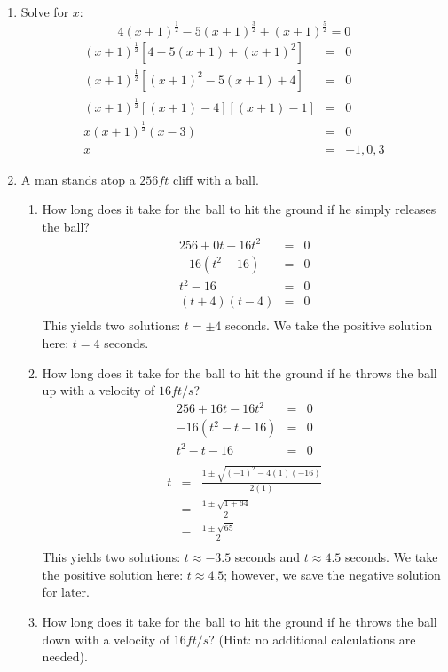 \documentclass[letterpaper,12pt,fleqn]{article}
\begin{document}
\begin{enumerate}
\item Solve for $x$:
  \[4(x+1)^{\frac{1}{2}}-5(x+1)^{\frac{3}{2}}+(x+1)^{\frac{5}{2}}=0\]
  \begin{eqnarray*}
    (x+1)^{\frac{1}{2}}[4-5(x+1)+(x+1)^2] &=& 0 \\
    (x+1)^{\frac{1}{2}}[(x+1)^2-5(x+1)+4] &=& 0 \\
    (x+1)^{\frac{1}{2}}[(x+1)-4][(x+1)-1] &=& 0 \\
    x(x+1)^{\frac{1}{2}}(x-3) &=& 0 \\
    x &=& -1,0,3
  \end{eqnarray*}

\item A man stands atop a $256ft$ cliff with a  ball.
\begin{enumerate}
\item How long does it take for the ball to hit the ground if he simply
releases the ball?
\begin{eqnarray*}
256+0t-16t^2 &=& 0 \\
-16(t^2-16) &=& 0 \\
t^2-16 &=& 0 \\
(t+4)(t-4) &=& 0 \\
\end{eqnarray*}
This yields two solutions: $t=\pm4$ seconds. We take the positive solution
here: $t=4$ seconds.

\item How long does it take for the ball to hit the ground if he throws the
ball up with a velocity of $16 ft/s$?
\begin{eqnarray*}
256+16t-16t^2 &=& 0 \\
-16(t^2-t-16) &=& 0 \\
t^2-t-16 &=& 0 \\
\end{eqnarray*}
\begin{eqnarray*}
t &=& \frac{1\pm\sqrt{(-1)^2-4(1)(-16)}}{2(1)} \\
    &=& \frac{1\pm\sqrt{1+64}}{2} \\
    &=& \frac{1\pm\sqrt{65}}{2} \\
\end{eqnarray*}
This yields two solutions: $t\approx-3.5$ seconds and $t\approx4.5$ seconds.
We take the positive solution here: $t\approx4.5$; however, we save the
negative solution for later.

\item How long does it take for the ball to hit the ground if he throws the
ball down with a velocity of $16 ft/s$? (Hint: no additional calculations are
needed).


\end{enumerate}
\end{enumerate}
\end{document}
